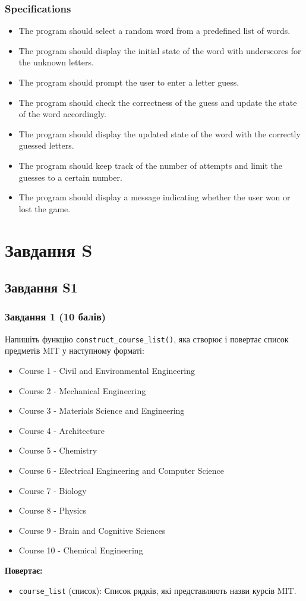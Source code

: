 \documentclass[12pt]{article}
\begin{document}
\subsubsection{Specifications}
\begin{itemize}
\item The program should select a random word from a predefined list of words.
\item The program should display the initial state of the word with underscores for the unknown letters.
\item The program should prompt the user to enter a letter guess.
\item The program should check the correctness of the guess and update the state of the word accordingly.
\item The program should display the updated state of the word with the correctly guessed letters.
\item The program should keep track of the number of attempts and limit the guesses to a certain number.
\item The program should display a message indicating whether the user won or lost the game.
\end{itemize}
\newpage

\section{Завдання S}

\subsection{Завдання S1}

\subsubsection{Завдання 1 (10 балів)}
Напишіть функцію \texttt{construct\_course\_list()}, яка створює і повертає список предметів MIT у наступному форматі:

\begin{itemize}
\item Course 1 - Civil and Environmental Engineering
\item Course 2 - Mechanical Engineering
\item Course 3 - Materials Science and Engineering
\item Course 4 - Architecture
\item Course 5 - Chemistry
\item Course 6 - Electrical Engineering and Computer Science
\item Course 7 - Biology
\item Course 8 - Physics
\item Course 9 - Brain and Cognitive Sciences
\item Course 10 - Chemical Engineering
\end{itemize}
\textbf{Повертає:}
\begin{itemize}
\item \texttt{course\_list} (список): Список рядків, які представляють назви курсів MIT.
\end{itemize}
\end{document}
